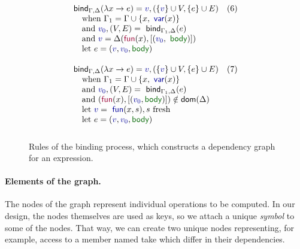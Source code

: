 \documentclass[sigplan,10pt,review,anonymous]{acmart}\settopmatter{printfolios=true,printccs=false,printacmref=false}
\theoremstyle{plain}
\theoremstyle{definition}
\newcommand{\ident}[1]{\textnormal{\sffamily #1}}
\newcommand{\bndclr}[1]{\textcolor{kvdclr}{#1}}
\newcommand{\bnd}[1]{\textnormal{\textcolor{kvdclr}{\sffamily #1}}}
\newcommand{\bknd}[1]{\textnormal{\textcolor{prepclr}{\sffamily #1}}}
\newcommand{\blbl}[1]{\textnormal{\textcolor{numclr}{\sffamily #1}}}
\begin{document}
\begin{figure}[t]
\begin{equation*}
\begin{array}{ll}
\\[1.25em]
\ident{bind}_{\Gamma, \Delta}(\lambda x \rightarrow e) = \bndclr{v}, (\{\bndclr{v}\} \cup V, \{e\} \cup E)&(6)\\
\quad \textnormal{when}~\Gamma_1 = \Gamma \cup \{ x, \bnd{var}(x) \}\\
\quad \textnormal{and}~\bndclr{v_0}, (V, E) = \ident{bind}_{\Gamma_1, \Delta}(e)\\
\quad \textnormal{and}~\bndclr{v} = \Delta(\bknd{fun}(x),[(\bndclr{v_0}, \blbl{body})])\\
\quad \textnormal{let}~e = (\bndclr{v}, \bndclr{v_0}, \blbl{body}) 
\\[1.25em]
\ident{bind}_{\Gamma, \Delta}(\lambda x \rightarrow e) = \bndclr{v}, (\{\bndclr{v}\} \cup V, \{e\} \cup E)&(7)\\
\quad \textnormal{when}~\Gamma_1 = \Gamma \cup \{ x, \bnd{var}(x) \}\\
\quad \textnormal{and}~\bndclr{v_0}, (V, E) = \ident{bind}_{\Gamma_1, \Delta}(e)\\
\quad \textnormal{and}~(\bknd{fun}(x),[(\bndclr{v_0}, \blbl{body})])\notin \ident{dom}(\Delta)\\
\quad \textnormal{let}~\bndclr{v} = \bnd{fun}(x, s), s~\textnormal{fresh}\\
\quad \textnormal{let}~e = (\bndclr{v},\bndclr{v_0},\blbl{body}) 
\\[0.75em]
\end{array}
\end{equation*}
\caption{Rules of the binding process, which constructs a dependency graph for an expression.}
\label{fig:binding-rules}
\end{figure}

\paragraph{Elements of the graph.} The nodes of the graph represent individual operations
to be computed. In our design, the nodes themselves are used as keys, so we attach a unique 
\emph{symbol} to some of the nodes. That way, we can create two unique nodes representing, 
for example, access to a member named \ident{take} which differ in their dependencies.
\end{document}
